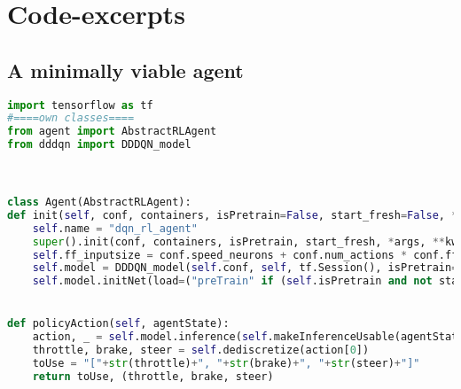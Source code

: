 


\chapter{Code-excerpts}


\section{A minimally viable agent} %

\label{AppendixD} %

\begin{lstlisting}[language=Python, frame=none]
import tensorflow as tf
#====own classes====
from agent import AbstractRLAgent
from dddqn import DDDQN_model 



class Agent(AbstractRLAgent):    
def init(self, conf, containers, isPretrain=False, start_fresh=False, *args, **kwargs):
	self.name = "dqn_rl_agent"
	super().init(conf, containers, isPretrain, start_fresh, *args, **kwargs)
	self.ff_inputsize = conf.speed_neurons + conf.num_actions * conf.ff_stacksize #32
	self.model = DDDQN_model(self.conf, self, tf.Session(), isPretrain=isPretrain)
	self.model.initNet(load=("preTrain" if (self.isPretrain and not start_fresh) else (not start_fresh)))


def policyAction(self, agentState):
	action, _ = self.model.inference(self.makeInferenceUsable(agentState)) 
	throttle, brake, steer = self.dediscretize(action[0])
	toUse = "["+str(throttle)+", "+str(brake)+", "+str(steer)+"]"
	return toUse, (throttle, brake, steer)
\end{lstlisting}%

\vspace*{2cm}
